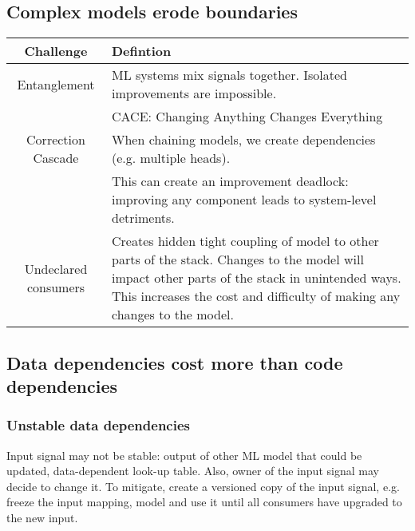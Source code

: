 \documentclass{report}
\begin{document}
\subsection{Complex models erode boundaries}
\begin{center}
    \begin{tabular}{ |c|p{10cm}|}
        \hline
        Challenge & Defintion \\
        \hline
        \hline
        Entanglement & ML systems mix signals together. Isolated improvements are impossible. \\
                     & CACE: Changing Anything Changes Everything \\
        \hline
        Correction Cascade & When chaining models, we create dependencies (e.g. multiple heads). \\
                           & This can create an improvement deadlock: improving any component leads to
                           system-level detriments. \\
        \hline
        Undeclared consumers & Creates hidden tight coupling of model to other parts of the stack.
            Changes to the model will impact other parts of the stack in unintended ways.
            This increases the cost and difficulty of making any changes to the model. \\
        \hline
    \end{tabular}
\end{center}

\subsection{Data dependencies cost more than code dependencies}

\subsubsection{Unstable data dependencies}
 Input signal may not be stable: output of other ML model that could
be updated, data-dependent look-up table. Also, owner of the input signal may decide to change
it. To mitigate, create a versioned copy of the input signal, e.g. freeze the input mapping, model
and use it until all consumers have upgraded to the new input. \\
\end{document}

